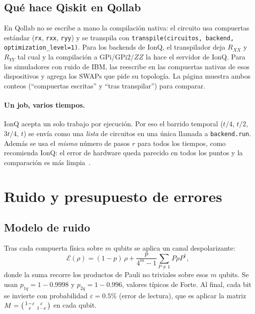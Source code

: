 \documentclass[11pt,a4paper]{article}
\newcommand{\RXX}{R_{XX}}
\newcommand{\RYY}{R_{YY}}
\newcommand{\code}[1]{\texttt{#1}}
\theoremstyle{plain}
\theoremstyle{definition}
\theoremstyle{remark}
\begin{document}
\subsection{Qué hace Qiskit en Qollab}

En Qollab no se escribe a mano la compilación nativa: el circuito usa compuertas estándar (\code{rx}, \code{rxx}, \code{ryy}) y se transpila con \code{transpile(circuitos, backend, optimization\_level=1)}. Para los backends de IonQ, el transpilador deja $\RXX$ y $\RYY$ tal cual y la compilación a GPi/GPi2/$ZZ$ la hace el servidor de IonQ. Para los simuladores con ruido de IBM, las reescribe en las compuertas nativas de esos dispositivos y agrega los SWAPs que pide su topología. La página muestra ambos conteos (``compuertas escritas'' y ``tras transpilar'') para comparar.

\paragraph{Un job, varios tiempos.} IonQ acepta un solo trabajo por ejecución. Por eso el barrido temporal ($t/4$, $t/2$, $3t/4$, $t$) se envía como una \emph{lista} de circuitos en una única llamada a \code{backend.run}. Además se usa el \emph{mismo} número de pasos $r$ para todos los tiempos, como recomienda IonQ: el error de hardware queda parecido en todos los puntos y la comparación es más limpia~\cite{ionqbest}.

\section{Ruido y presupuesto de errores}
\label{sec:ruido}

\subsection{Modelo de ruido}

Tras cada compuerta física sobre $m$ qubits se aplica un canal despolarizante:
\begin{equation}
\mathcal E(\rho)=(1-p)\,\rho+\frac{p}{4^m-1}\sum_{P\ne\mathbb 1}P\rho P^\dagger,
\end{equation}
donde la suma recorre los productos de Pauli no triviales sobre esos $m$ qubits. Se usan $p_{1q}=1-0.9998$ y $p_{2q}=1-0.996$, valores típicos de Forte. Al final, cada bit se invierte con probabilidad $\varepsilon=0.5\%$ (error de lectura), que es aplicar la matriz $M=\begin{psmallmatrix}1-\varepsilon&\varepsilon\\\varepsilon&1-\varepsilon\end{psmallmatrix}$ en cada qubit.
\end{document}
